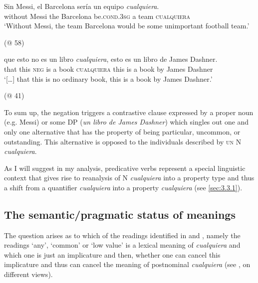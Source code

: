 {\ea \label{bkm:Ref66615171}  %

\gll Sin Messi, el Barcelona sería un equipo \textit{cualquiera}.\\
without Messi the Barcelona be.\textsc{cond.3sg} a team \textsc{cualquiera}\\
\glt ‘Without Messi, the team Barcelona would be some unimportant football team.’

  (@ 58)
\z

\ea \label{bkm:Ref150779604} %
\gll […] que esto no es un libro \textit{cualquiera}, esto es un libro de James Dashner.\\
[…] that this \textsc{neg} is a book \textsc{cualquiera} this is a book by James Dashner\\
\glt ‘[…] that this is no ordinary book, this is a book by James Dashner.’

  (@ 41)
\z

To sum up, the negation triggers a contrastive clause expressed by a proper noun (e.g. Messi) or some DP (\textit{un libro de James Dashner}) which singles out one and only one alternative that has the property of being particular, uncommon, or outstanding. This alternative is opposed to the individuals described by \textsc{un} N \textit{cualquiera}.

As I will suggest in my analysis, predicative verbs represent a special linguistic context that gives rise to reanalysis of N \textit{cualquiera} into a property type and thus a shift from a quantifier \textit{cualquiera} into a property \textit{cualquiera} (see \ref{sec:3.3.1}).

\subsection{{The} {semantic/pragmatic} {status} {of} {meanings}} \label{sec:3.2.3}

The question arises as to which of the readings identified in  and , namely the readings ‘any’, ‘common’ or ‘low value’ is a lexical meaning of \textit{cualquiera} and which one is just an implicature and then, whether one can cancel this implicature and thus can cancel the meaning of postnominal \textit{cualquiera} (see \citealt{Aloni2021}, \citealt{am2018} on different views).

}

